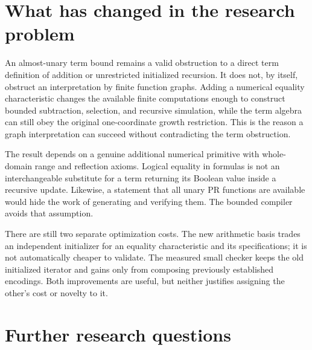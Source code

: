 \section{What has changed in the research problem}

An almost-unary term bound remains a valid obstruction to a direct term definition of addition or unrestricted initialized recursion. It does not, by itself, obstruct an interpretation by finite function graphs. Adding a numerical equality characteristic changes the available finite computations enough to construct bounded subtraction, selection, and recursive simulation, while the term algebra can still obey the original one-coordinate growth restriction. This is the reason a graph interpretation can succeed without contradicting the term obstruction.

The result depends on a genuine additional numerical primitive with whole-domain range and reflection axioms. Logical equality in formulas is not an interchangeable substitute for a term returning its Boolean value inside a recursive update. Likewise, a statement that all unary PR functions are available would hide the work of generating and verifying them. The bounded compiler avoids that assumption.

There are still two separate optimization costs. The new arithmetic basis trades an independent initializer for an equality characteristic and its specifications; it is not automatically cheaper to validate. The measured small checker keeps the old initialized iterator and gains only from composing previously established encodings. Both improvements are useful, but neither justifies assigning the other's cost or novelty to it.

\section{Further research questions}


